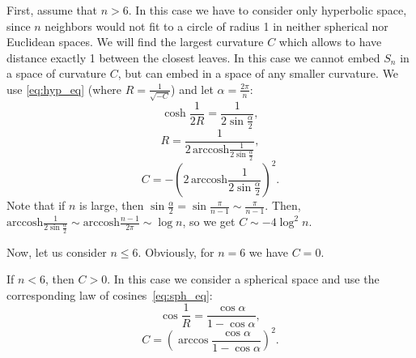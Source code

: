 \documentclass[runningheads]{llncs}
\begin{document}
First, assume that $n > 6$. In this case we have to consider only hyperbolic space, since $n$ neighbors would not fit to a circle of radius 1 in neither spherical nor Euclidean spaces.
We will find the largest curvature $C$ which allows to have distance exactly 1 between the closest leaves. In this case we cannot embed $S_n$ in a space of curvature $C$, but can embed in a space of any smaller curvature. 
We use \eqref{eq:hyp_eq} (where $R = \frac{1}{\sqrt{-C}}$) and let $\alpha = \frac{2\pi}{n}$:
\[
\cosh\frac{1}{2R} = \frac{1}{2\sin \frac{\alpha}{2}},
\]
\[
R = \frac{1}{2\,\textrm{arccosh}\frac{1}{2\sin \frac{\alpha}{2}}},
\]
\[
C = - \left(2\,\textrm{arccosh}\frac{1}{2\sin \frac{\alpha}{2}}\right)^2.
\]
Note that if $n$ is large, then $\sin \frac{\alpha}{2} = \sin\frac{\pi}{n-1} \sim \frac{\pi}{n-1}$. Then,  $\textrm{arccosh}\frac{1}{2\sin \frac{\alpha}{2}} \sim \textrm{arccosh}\frac{n-1}{2\pi} \sim \log n$, so we get $C \sim - 4 \log^2 n$. 

Now, let us consider $n \le 6$. Obviously, for $n = 6$ we have $C = 0$. 

If $n < 6$, then $C > 0$. 
In this case we consider a spherical space and use the corresponding law of cosines~\eqref{eq:sph_eq}:
\[
\cos{\frac{1}{R}} = \frac{\cos \alpha}{1 - \cos \alpha},
\]
\[
C = \left(\arccos \frac{\cos \alpha}{1 - \cos \alpha}\right)^2.
\]
\end{document}
